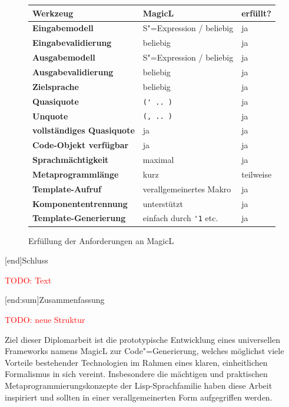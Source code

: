 \documentclass[12pt, a4paper, bibgerm]{scrbook}
\newcommand\icode[1]{\lstinline?#1?}
\newcommand{\todo}[1]{
  \textcolor{red}{TODO: #1}
}
\newcommand\lchapter{}
\newcommand\lsection{}
\newcommand{\sexp}{S"=Expression}
\newcommand{\cgen}{Code"=Generierung}
\begin{document}
\begin{figure}[h]
\begin{tabular}{|l|l|l|} \hline
\bf Werkzeug                 & \bf MagicL                    & \bf erfüllt?  \\\hline\hline    
\bf Eingabemodell            & \sexp{} / beliebig            &     ja        \\\hline           
\bf Eingabevalidierung       & beliebig                      &     ja        \\\hline      
\bf Ausgabemodell            & \sexp{} / beliebig            &     ja        \\\hline      
\bf Ausgabevalidierung       & beliebig                      &     ja        \\\hline      
\bf Zielsprache              & beliebig                      &     ja        \\\hline      
\bf Quasiquote               & \icode{(' .. )}               &     ja        \\\hline   
\bf Unquote                  & \icode{(, .. )}               &     ja        \\\hline
\bf vollständiges Quasiquote & ja                            &     ja        \\\hline      
\bf Code-Objekt verfügbar    & ja                            &     ja        \\\hline      
\bf Sprachmächtigkeit        & maximal                       &     ja        \\\hline      
\bf Metaprogrammlänge        & kurz                          & teilweise     \\\hline
\bf Template-Aufruf          & verallgemeinertes Makro       &     ja        \\\hline      
\bf Komponententrennung      & unterstützt                   &     ja        \\\hline      
\bf Template-Generierung     & einfach durch \icode{'1} etc. &     ja        \\\hline      
\end{tabular}
\caption{Erfüllung der Anforderungen an MagicL}
\label{magicl:fig:disc_reqs}
\end{figure}

\lchapter[end]{Schluss}

\todo{Text}

\lsection[end:sum]{Zusammenfassung}

\todo{neue Struktur}

Ziel dieser Diplomarbeit ist die prototypische Entwicklung eines
universellen Frameworks namens MagicL zur \cgen{}, welches möglichst
viele Vorteile bestehender Technologien im Rahmen eines klaren,
einheitlichen Formalismus in sich vereint. Insbesondere die mächtigen
und praktischen Metaprogrammierungskonzepte der Lisp-Sprachfamilie haben
diese Arbeit inspiriert und sollten in einer verallgemeinerten Form
aufgegriffen werden.
\end{document}
